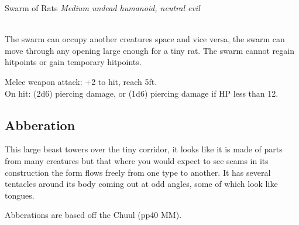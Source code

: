 \documentclass[10pt,twoside,twocolumn]{article}
\begin{document}
\begin{monsterbox}{Swarm of Rats}
	\textit{Medium undead humanoid, neutral evil}\\
	\hline
	\basics[%
	armorclass = 10,
	hitpoints  = 24 (7d8-7),
	speed      = 30 ft
	]
	\hline
	\stats[
	STR = 9 (-1),
	DEX = 11 (0),
	CON = 9 (-1),
	INT = 2 (-4),
	WIS = 10 (0),
	CHA = 3 (-4)
	]
	\hline
	\details[%
	languages = {None},
	]
	\hline \\[1mm]
	\begin{monsteraction}[Swarm]
		The swarm can occupy another creatures space and vice versa, the swarm can move through any opening large enough for a tiny rat. The swarm cannot regain hitpoints or gain temporary hitpoints.
	\end{monsteraction}
	\begin{monsteraction}[Bites.]
		Melee weapon attack: +2 to hit, reach 5ft. \\
		
		On hit: (2d6) piercing damage, or (1d6) piercing damage if HP less than 12.
	\end{monsteraction}
\end{monsterbox}

\subsection{Abberation}

\begin{quotebox}
This large beast towers over the tiny corridor, it looks like it is made of parts from many creatures but that where you would expect to see seams in its construction the form flows freely from one type to another. It has several tentacles around its body coming out at odd angles, some of which look like tongues.
\end{quotebox}

Abberations are based off the Chuul (pp40 MM). \\
\end{document}
